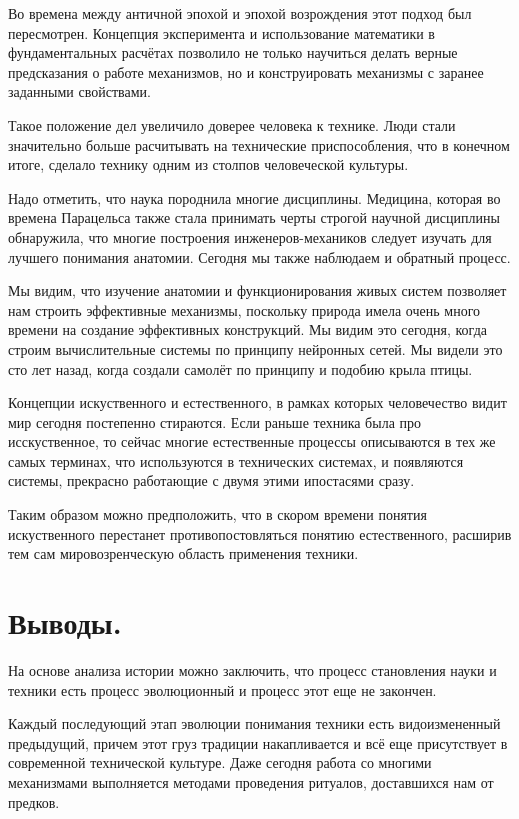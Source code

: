 \documentclass[a4paper]{article}
\begin{document}
{Во времена между античной эпохой и эпохой возрождения этот подход был пересмотрен. Концепция эксперимента и использование математики в фундаментальных расчётах позволило не только научиться делать верные предсказания о работе механизмов, но и конструировать механизмы с заранее заданными свойствами.

Такое положение дел увеличило доверее человека к технике. Люди стали значительно больше расчитывать на технические приспособления, что в конечном итоге, сделало технику одним из столпов человеческой культуры. 

Надо отметить, что наука породнила многие дисциплины. Медицина, которая во времена Парацельса также стала принимать черты строгой научной дисциплины обнаружила, что многие построения инженеров-механиков следует изучать для лучшего понимания анатомии. Сегодня мы также наблюдаем и обратный процесс. 

Мы видим, что изучение анатомии и функционирования живых систем позволяет нам строить эффективные механизмы, поскольку природа имела очень много времени на создание эффективных конструкций. Мы видим это сегодня, когда строим вычислительные системы по принципу нейронных сетей. Мы видели это сто лет назад, когда создали самолёт по принципу и подобию крыла птицы.

Концепции искуственного и естественного, в рамках которых человечество видит мир сегодня постепенно стираются. Если раньше техника была про исскуственное, то сейчас многие естественные процессы описываются в тех же самых терминах, что используются в технических системах, и появляются системы, прекрасно работающие с двумя этими ипостасями сразу.

Таким образом можно предположить, что в скором времени понятия искуственного перестанет противопостовляться понятию естественного, расширив тем сам мировозренческую область применения техники.

\section{Выводы.}
На основе анализа истории можно заключить, что процесс становления науки и техники есть процесс эволюционный и процесс этот еще не закончен. 

Каждый последующий этап эволюции понимания техники есть видоизмененный предыдущий, причем этот груз традиции накапливается и всё еще присутствует в современной технической культуре. Даже сегодня работа со многими механизмами выполняется методами проведения ритуалов, доставшихся нам от предков.

}
\end{document}
